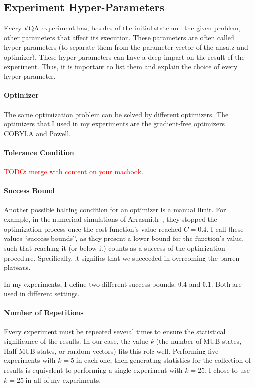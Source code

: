 \documentclass[a4paper,12pt]{article}
\newcommand{\mytodo}[1]{\textcolor{red}{TODO: #1}}
\begin{document}
\subsection{Experiment Hyper-Parameters} \label{subsec:hyperparams}
Every VQA experiment has, besides of the initial state and the given problem, other parameters that affect its execution.
These parameters are often called hyper-parameters (to separate them from the parameter vector of the ansatz and optimizer).
These hyper-parameters can have a deep impact on the result of the experiment.
Thus, it is important to list them and explain the choice of every hyper-parameter.

\paragraph*{Optimizer}
The same optimization problem can be solved by different optimizers.
The optimizers that I used in my experiments are the gradient-free optimizers COBYLA and Powell.

\paragraph*{Tolerance Condition}
\mytodo{merge with content on your macbook.}

\paragraph*{Success Bound}
Another possible halting condition for an optimizer is a manual limit.
For example, in the numerical simulations of Arrasmith~\cite{arrasmith_effect_2021}, they stopped the optimization process once the cost function's value reached $C=0.4$.
I call these values ``success bounds'', as they present a lower bound for the function's value, such that reaching it (or below it) counts as a success of the optimization procedure. Specifically, it signifies that we succeeded in overcoming the barren plateaus.

In my experiments, I define two different success bounds: 0.4 and 0.1.
Both are used in different settings.

\paragraph*{Number of Repetitions}
Every experiment must be repeated several times to ensure the statistical significance of the results. In our case, the value $k$ (the number of MUB states, Half-MUB states, or random vectors) fits this role well.
Performing five experiments with $k=5$ in each one, then generating statistics for the collection of results is equivalent to performing a single experiment with $k=25$.
I chose to use $k=25$ in all of my experiments.
\end{document}
